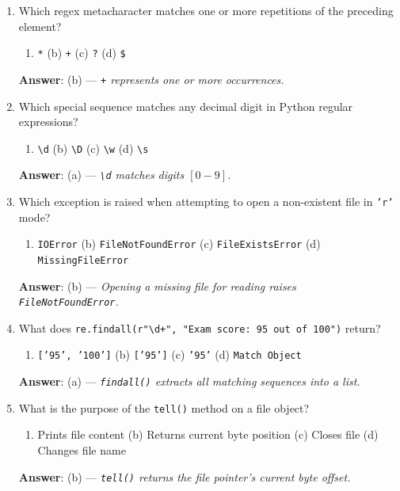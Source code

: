 \begin{enumerate}[leftmargin=1.5em]
    \item Which regex metacharacter matches one or more repetitions of the preceding element?
    \begin{enumerate}[label=(\alph*)]
        \item \texttt{*} \quad (b) \texttt{+} \quad (c) \texttt{?} \quad (d) \texttt{\$}
    \end{enumerate}
    \textbf{Answer}: (b) --- \textit{\texttt{+} represents one or more occurrences.}

    \item Which special sequence matches any decimal digit in Python regular expressions?
    \begin{enumerate}[label=(\alph*)]
        \item \texttt{\textbackslash d} \quad (b) \texttt{\textbackslash D} \quad (c) \texttt{\textbackslash w} \quad (d) \texttt{\textbackslash s}
    \end{enumerate}
    \textbf{Answer}: (a) --- \textit{\texttt{\textbackslash d} matches digits $[0-9]$.}

    \item Which exception is raised when attempting to open a non-existent file in \texttt{'r'} mode?
    \begin{enumerate}[label=(\alph*)]
        \item \texttt{IOError} \quad (b) \texttt{FileNotFoundError} \quad (c) \texttt{FileExistsError} \quad (d) \texttt{MissingFileError}
    \end{enumerate}
    \textbf{Answer}: (b) --- \textit{Opening a missing file for reading raises \texttt{FileNotFoundError}.}

    \item What does \texttt{re.findall(r"\textbackslash d+", "Exam score: 95 out of 100")} return?
    \begin{enumerate}[label=(\alph*)]
        \item \texttt{['95', '100']} \quad (b) \texttt{['95']} \quad (c) \texttt{'95'} \quad (d) \texttt{Match Object}
    \end{enumerate}
    \textbf{Answer}: (a) --- \textit{\texttt{findall()} extracts all matching sequences into a list.}

    \item What is the purpose of the \texttt{tell()} method on a file object?
    \begin{enumerate}[label=(\alph*)]
        \item Prints file content \quad (b) Returns current byte position \quad (c) Closes file \quad (d) Changes file name
    \end{enumerate}
    \textbf{Answer}: (b) --- \textit{\texttt{tell()} returns the file pointer's current byte offset.}
\end{enumerate}

